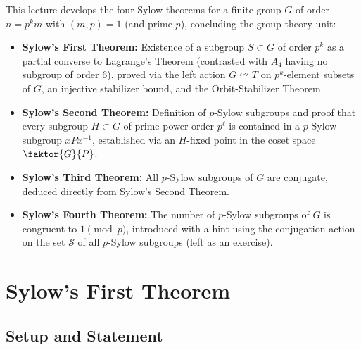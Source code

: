 \begin{overview}
This lecture develops the four Sylow theorems for a finite group $G$ of order $n = p^k m$ with $(m, p) = 1$ (and prime $p$), concluding the group theory unit:
\begin{itemize}
    \item \textbf{Sylow's First Theorem:} Existence of a subgroup $S \subset G$ of order $p^k$ as a partial converse to Lagrange's Theorem (contrasted with $A_4$ having no subgroup of order $6$), proved via the left action $G \curvearrowright T$ on $p^k$-element subsets of $G$, an injective stabilizer bound, and the Orbit-Stabilizer Theorem.
    \item \textbf{Sylow's Second Theorem:} Definition of $p$-Sylow subgroups and proof that every subgroup $H \subset G$ of prime-power order $p^\ell$ is contained in a $p$-Sylow subgroup $x P x^{-1}$, established via an $H$-fixed point in the coset space $\faktor{G}{P}$.
    \item \textbf{Sylow's Third Theorem:} All $p$-Sylow subgroups of $G$ are conjugate, deduced directly from Sylow's Second Theorem.
    \item \textbf{Sylow's Fourth Theorem:} The number of $p$-Sylow subgroups of $G$ is congruent to $1 \pmod p$, introduced with a hint using the conjugation action on the set $\mathcal{S}$ of all $p$-Sylow subgroups (left as an exercise).
\end{itemize}
\end{overview}

\section{Sylow's First Theorem}

\subsection{Setup and Statement}

